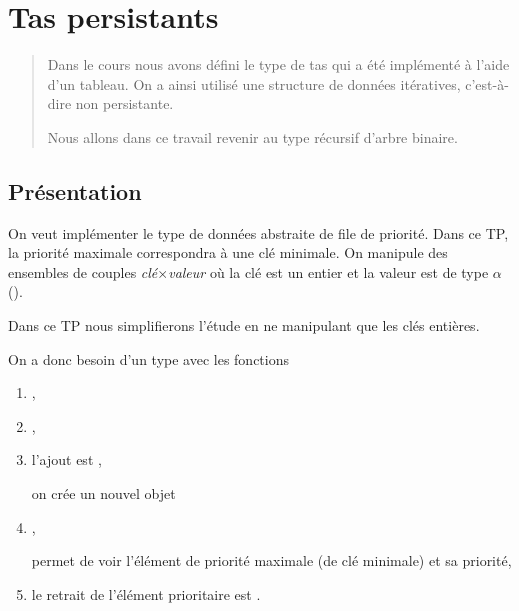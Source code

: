 \chapter{Tas persistants}
\thispagestyle{empty}
\begin{abstract}
Dans le cours nous avons défini le type de tas qui a été implémenté à l'aide d'un tableau. On a ainsi utilisé une structure de données itératives, c'est-à-dire non persistante.

Nous allons dans ce travail revenir au type récursif d'arbre binaire.
\end{abstract}
\section{Présentation}
On veut implémenter le type de données abstraite de file de priorité. Dans ce TP, la priorité maximale correspondra à une clé minimale. On manipule des ensembles de couples {\it clé$\times$valeur} où la clé est un entier et la valeur est de type $\alpha$ ().

Dans ce TP nous simplifierons l'étude en ne manipulant que les clés entières.


On a donc besoin d'un type  avec les fonctions
\begin{enumerate}
\item {}, 
\item {},
\item l'ajout est , 

 on crée un nouvel objet
\item {} ,

permet de voir l'élément de priorité maximale (de clé minimale) et sa priorité,
\item le retrait de l'élément prioritaire est .
\end{enumerate}
%
\bigskip


